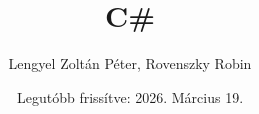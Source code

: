 \documentclass{article}
\title{C\#}
\author{Lengyel Zoltán Péter, Rovenszky Robin}
\date{Legutóbb frissítve: 2026. Március 19.}
\begin{document}
\maketitle
\tableofcontents
\newpage

\begin{lstlisting}


\end{lstlisting}
\end{document}
